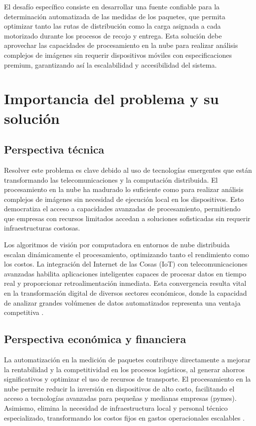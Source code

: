 El desafío específico consiste en desarrollar una fuente confiable para la determinación automatizada de las medidas de los paquetes, que permita optimizar tanto las rutas de distribución como la carga asignada a cada motorizado durante los procesos de recojo y entrega. Esta solución debe aprovechar las capacidades de procesamiento en la nube para realizar análisis complejos de imágenes sin requerir dispositivos móviles con especificaciones premium, garantizando así la escalabilidad y accesibilidad del sistema.
\section{Importancia del problema y su solución}

\subsection{Perspectiva técnica}

Resolver este problema es clave debido al uso de tecnologías emergentes que están transformando las telecomunicaciones y la computación distribuida. El procesamiento en la nube ha madurado lo suficiente como para realizar análisis complejos de imágenes sin necesidad de ejecución local en los dispositivos. Esto democratiza el acceso a capacidades avanzadas de procesamiento, permitiendo que empresas con recursos limitados accedan a soluciones sofisticadas sin requerir infraestructuras costosas.

Los algoritmos de visión por computadora en entornos de nube distribuida escalan dinámicamente el procesamiento, optimizando tanto el rendimiento como los costos. La integración del Internet de las Cosas (IoT) con telecomunicaciones avanzadas habilita aplicaciones inteligentes capaces de procesar datos en tiempo real y proporcionar retroalimentación inmediata. Esta convergencia resulta vital en la transformación digital de diversos sectores económicos, donde la capacidad de analizar grandes volúmenes de datos automatizados representa una ventaja competitiva \cite{RedaccinTLW2024,Jurez2023}.

\subsection{Perspectiva económica y financiera}

La automatización en la medición de paquetes contribuye directamente a mejorar la rentabilidad y la competitividad en los procesos logísticos, al generar ahorros significativos y optimizar el uso de recursos de transporte. El procesamiento en la nube permite reducir la inversión en dispositivos de alto costo, facilitando el acceso a tecnologías avanzadas para pequeñas y medianas empresas (pymes). Asimismo, elimina la necesidad de infraestructura local y personal técnico especializado, transformando los costos fijos en gastos operacionales escalables \cite{Krysiska2024}.

